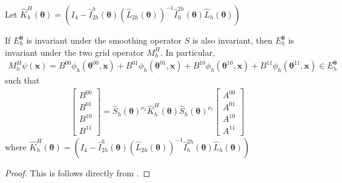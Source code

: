 \documentclass[12pt]{article}
\begin{document}
Let $\widehat{K}^H_h\left(\boldsymbol{\theta}\right) = \left(I_4 - \widehat{I}^h_{2h}\left(\boldsymbol{\theta}\right)\left(\widehat{L}_{2h}\left(\boldsymbol{\theta}\right)\right)^{-1}\widehat{I}^{2h}_h\left(\boldsymbol{\theta}\right)\widehat{L}_h\left(\boldsymbol{\theta}\right)\right)$

\begin{corollary}
    If $E^{\boldsymbol{\theta}}_h$ is invariant under the smoothing operator $S$ is also invariant, then $E^{\boldsymbol{\theta}}_h$ is invariant under the two grid operator $M^H_h$. In particular, 
    \begin{align*}
        M^H_h \psi(\mathbf{x})= B^{00}\phi_h(\boldsymbol{\theta}^{00}, \mathbf{x}) + B^{01}\phi_h(\boldsymbol{\theta}^{01}, \mathbf{x}) + B^{10}\phi_h(\boldsymbol{\theta}^{10}, \mathbf{x}) + B^{11}\phi_h(\boldsymbol{\theta}^{11}, \mathbf{x}) \in E^{\boldsymbol{\theta}}_h
    \end{align*} 
    such that 
    \begin{align*}
        \begin{bmatrix}
        B^{00}\\
        B^{01}\\
        B^{10}\\
        B^{11}
    \end{bmatrix} = \widehat{S}_h\left(\boldsymbol{\theta}\right)^{\nu_2}\widehat{K}^H_h\left(\boldsymbol{\theta}\right)\widehat{S}_h\left(\boldsymbol{\theta}\right)^{\nu_1}\begin{bmatrix}
        A^{00}\\
        A^{01}\\
        A^{10}\\
        A^{11}
    \end{bmatrix}
    \end{align*}
    where $\widehat{K}^H_h\left(\boldsymbol{\theta}\right) = \left(I_4 - \widehat{I}^h_{2h}\left(\boldsymbol{\theta}\right)\left(\widehat{L}_{2h}\left(\boldsymbol{\theta}\right)\right)^{-1}\widehat{I}^{2h}_h\left(\boldsymbol{\theta}\right)\widehat{L}_h\left(\boldsymbol{\theta}\right)\right)$
\end{corollary}

\begin{proof}
    This is follows directly from .
\end{proof}
\end{document}
